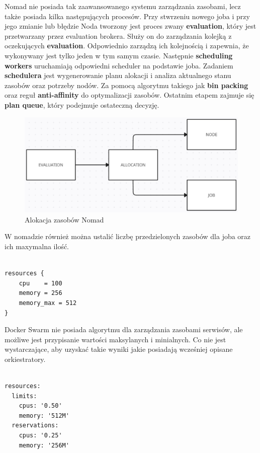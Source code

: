 \documentclass{iiuwb}
\begin{document}
Nomad nie posiada tak zaawansowanego systemu zarządzania zasobami, 
lecz także posiada kilka następujących procesów. Przy stwrzeniu 
nowego joba i przy jego zmianie lub błędzie Noda tworzony jest proces zwany 
\textbf{evaluation}, który jest przetwarzany przez evaluation brokera. 
Służy on do zarządzania kolejką z oczekujących \textbf{evaluation}. 
Odpowiednio zarządzą ich kolejnością i zapewnia, że wykonywany 
jest tylko jeden w tym samym czasie. Następnie 
\textbf{scheduling workers} uruchamiają odpowiedni scheduler 
na podstawie joba. Zadaniem \textbf{schedulera} jest wygenerowanie 
planu alokacji i analiza aktualnego stanu zasobów oraz potrzeby 
nodów. Za pomocą algorytmu takiego jak \textbf{bin packing} oraz 
reguł \textbf{anti-affinity} do optymalizacji zasobów. Ostatnim 
etapem zajmuje się \textbf{plan queue}, który podejmuje ostateczną 
decyzję.

\begin{figure}[!h]
  \centering
  \includegraphics[width=12cm]{nomadalokacja.pdf}
  \caption{Alokacja zasobów Nomad}
  \label{fig: Alokacja zasobów Nomad}
\end{figure}

W nomadzie również można ustalić liczbę przedzielonych 
zasobów dla joba oraz ich maxymalna ilość.

\begin{lstlisting}[breaklines=true]

resources {
    cpu    = 100
    memory = 256
    memory_max = 512
}

\end{lstlisting}

Docker Swarm nie posiada algorytmu dla zarządzania zasobami 
serwisów, ale możliwe jest przypisanie wartości maksylanych 
i minialnych. Co nie jest wystarczające, aby uzyskać takie 
wyniki jakie posiadają wcześniej opisane orkiestratory.

\begin{lstlisting}[breaklines=true]

resources:
  limits:
    cpus: '0.50'   
    memory: '512M' 
  reservations:
    cpus: '0.25'   
    memory: '256M' 

\end{lstlisting}
\end{document}
